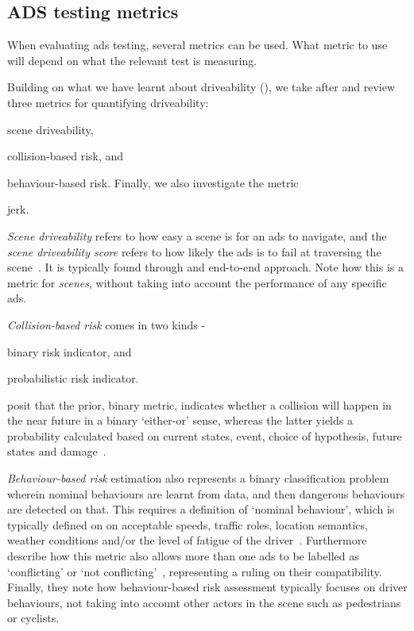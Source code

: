 \subsection{ADS testing metrics}\label{sec:adsMetrics}

When evaluating \acrshort{ads} testing, several metrics can be used. What metric to use will depend
on what the relevant test is measuring.

Building on what we have learnt about driveability (),
we take after \citeauthor{safeToDrive} and review three metrics for
quantifying driveability: \begin{inparaenum}
    \item scene driveability,
    \item collision-based risk, and
    \item behaviour-based risk. Finally, we also investigate the metric
    \item jerk.
\end{inparaenum}

\emph{Scene driveability} refers to how easy a scene is for an
\acrshort{ads} to navigate, and the \textit{scene driveability score} refers to
how likely the \acrlong{ads} is to fail at traversing the
scene~\cite[3140]{safeToDrive}. It is typically found through and end-to-end
approach. Note how this is a metric for \textit{scenes}, without taking into
account the performance of any specific \acrshort{ads}.

\emph{Collision-based risk} comes in two kinds - \begin{inparaenum}
    \item binary risk indicator, and
    \item probabilistic risk indicator.
\end{inparaenum} \citeauthor{safeToDrive} posit that the prior, binary metric, indicates whether a
collision will happen in the near future in a binary `either-or' sense, whereas the latter yields a
probability calculated based on current states, event, choice of hypothesis, future states and
damage~\cite[3140]{safeToDrive}.

\emph{Behaviour-based risk} estimation also represents a binary classification problem wherein
nominal behaviours are learnt from data, and then dangerous behaviours are detected on that. This
requires a definition of `nominal behaviour', which is typically defined on on acceptable speeds,
traffic roles, location semantics, weather conditions and/or the level of fatigue of the
driver~\cite[3140]{safeToDrive}. Furthermore \citeauthor{safeToDrive} describe how this metric also
allows more than one \acrshort{ads} to be labelled as `conflicting' or `not
conflicting'~\cite[3140]{safeToDrive}, representing a ruling on their compatibility. Finally, they
note how behaviour-based risk assessment typically focuses on driver behaviours, not taking into
account other actors in the scene such as pedestrians or cyclists.

